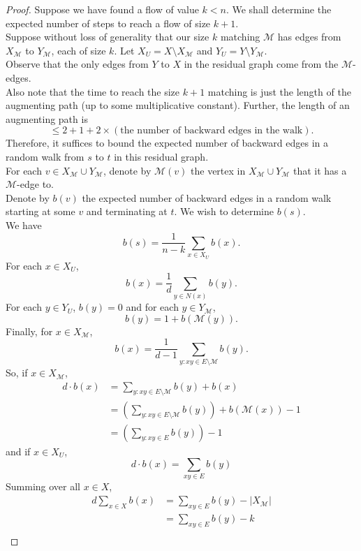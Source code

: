 			\begin{proof}
				Suppose we have found a flow of value $k<n$. We shall determine the expected number of steps to reach a flow of size $k+1$.\\
				Suppose without loss of generality that our size $k$ matching $\mathcal{M}$ has edges from $X_\mathcal{M}$ to $Y_\mathcal{M}$, each of size $k$. Let $X_U = X \setminus X_\mathcal{M}$ and $Y_U = Y \setminus Y_\mathcal{M}$. \\
				Observe that the only edges from $Y$ to $X$ in the residual graph come from the $\mathcal{M}$-edges.\\
				Also note that the time to reach the size $k+1$ matching is just the length of the augmenting path (up to some multiplicative constant). Further, the length of an augmenting path is
				\[ \le 2 + 1 + 2 \times (\text{the number of backward edges in the walk}). \]
				Therefore, it suffices to bound the expected number of backward edges in a random walk from $s$ to $t$ in this residual graph.\\
				For each $v\in X_\mathcal{M} \cup Y_\mathcal{M}$, denote by $\mathcal{M}(v)$ the vertex in $X_\mathcal{M} \cup Y_\mathcal{M}$ that it has a $\mathcal{M}$-edge to.\\
				Denote by $b(v)$ the expected number of backward edges in a random walk starting at some $v$ and terminating at $t$. We wish to determine $b(s)$. \\
				We have
				\[ b(s) = \frac{1}{n-k} \sum_{x\in X_U} b(x). \]
				For each $x\in X_U$,
				\[ b(x) = \frac{1}{d} \sum_{y \in N(x)} b(y). \]
				For each $y\in Y_U$, $b(y) = 0$ and for each $y\in Y_\mathcal{M}$,
				\[ b(y) = 1 + b(\mathcal{M}(y)). \]
				Finally, for $x\in X_\mathcal{M}$,
				\[ b(x) = \frac{1}{d-1} \sum_{y: xy \in E \setminus \mathcal{M}} b(y). \]
				So, if $x \in X_\mathcal{M}$,
				\begin{align*}
					d \cdot b(x) &= \sum_{y: xy \in E \setminus \mathcal{M}} b(y) + b(x) \\
						&= \left(\sum_{y: xy \in E \setminus \mathcal{M}} b(y)\right) + b(\mathcal{M}(x)) - 1 \\
						&= \left(\sum_{y: xy \in E} b(y)\right) - 1
				\end{align*}
				and if $x \in X_U$,
				\[ d \cdot b(x) = \sum_{xy \in E} b(y) \]
				Summing over all $x \in X$,
				\begin{align*}
					d \sum_{x \in X} b(x) &= \sum_{xy \in E} b(y) - |X_\mathcal{M}| \\
						&= \sum_{xy \in E} b(y) - k \\

\end{align*}
\end{proof}

